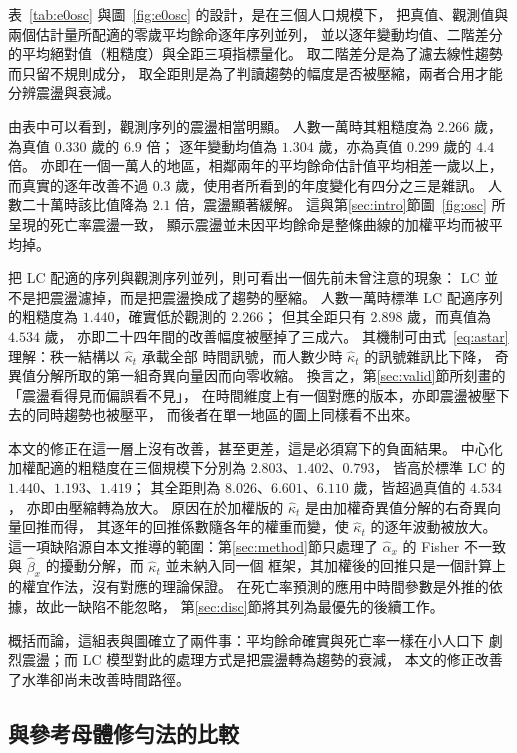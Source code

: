\documentclass[UTF8, fontset=macnew, a4paper, 12pt]{ctexart}
\begin{document}
表~\ref{tab:e0osc} 與圖~\ref{fig:e0osc} 的設計，是在三個人口規模下，
把真值、觀測值與兩個估計量所配適的零歲平均餘命逐年序列並列，
並以逐年變動均值、二階差分的平均絕對值（粗糙度）與全距三項指標量化。
取二階差分是為了濾去線性趨勢而只留不規則成分，
取全距則是為了判讀趨勢的幅度是否被壓縮，兩者合用才能分辨震盪與衰減。

由表中可以看到，觀測序列的震盪相當明顯。
人數一萬時其粗糙度為 $2.266$ 歲，為真值 $0.330$ 歲的 $6.9$ 倍；
逐年變動均值為 $1.304$ 歲，亦為真值 $0.299$ 歲的 $4.4$ 倍。
亦即在一個一萬人的地區，相鄰兩年的平均餘命估計值平均相差一歲以上，
而真實的逐年改善不過 $0.3$ 歲，使用者所看到的年度變化有四分之三是雜訊。
人數二十萬時該比值降為 $2.1$ 倍，震盪顯著緩解。
這與第\ref{sec:intro}節圖~\ref{fig:osc} 所呈現的死亡率震盪一致，
顯示震盪並未因平均餘命是整條曲線的加權平均而被平均掉。

把 LC 配適的序列與觀測序列並列，則可看出一個先前未曾注意的現象：
LC 並不是把震盪濾掉，而是把震盪換成了趨勢的壓縮。
人數一萬時標準 LC 配適序列的粗糙度為 $1.440$，確實低於觀測的 $2.266$；
但其全距只有 $2.898$ 歲，而真值為 $4.534$ 歲，
亦即二十四年間的改善幅度被壓掉了三成六。
其機制可由式~\eqref{eq:astar} 理解：秩一結構以 $\hat\kappa_t$ 承載全部
時間訊號，而人數少時 $\hat\kappa_t$ 的訊號雜訊比下降，
奇異值分解所取的第一組奇異向量因而向零收縮。
換言之，第\ref{sec:valid}節所刻畫的「震盪看得見而偏誤看不見」，
在時間維度上有一個對應的版本，亦即震盪被壓下去的同時趨勢也被壓平，
而後者在單一地區的圖上同樣看不出來。

本文的修正在這一層上沒有改善，甚至更差，這是必須寫下的負面結果。
中心化加權配適的粗糙度在三個規模下分別為 $2.803$、$1.402$、$0.793$，
皆高於標準 LC 的 $1.440$、$1.193$、$1.419$；
其全距則為 $8.026$、$6.601$、$6.110$ 歲，皆超過真值的 $4.534$，
亦即由壓縮轉為放大。
原因在於加權版的 $\hat\kappa_t$ 是由加權奇異值分解的右奇異向量回推而得，
其逐年的回推係數隨各年的權重而變，使 $\hat\kappa_t$ 的逐年波動被放大。
這一項缺陷源自本文推導的範圍：第\ref{sec:method}節只處理了 $\hat\alpha_x$ 的
Fisher 不一致與 $\hat\beta_x$ 的擾動分解，而 $\hat\kappa_t$ 並未納入同一個
框架，其加權後的回推只是一個計算上的權宜作法，沒有對應的理論保證。
在死亡率預測的應用中時間參數是外推的依據，故此一缺陷不能忽略，
第\ref{sec:disc}節將其列為最優先的後續工作。

概括而論，這組表與圖確立了兩件事：平均餘命確實與死亡率一樣在小人口下
劇烈震盪；而 LC 模型對此的處理方式是把震盪轉為趨勢的衰減，
本文的修正改善了水準卻尚未改善時間路徑。

\subsection{與參考母體修勻法的比較}\label{sec:smr}
\end{document}
